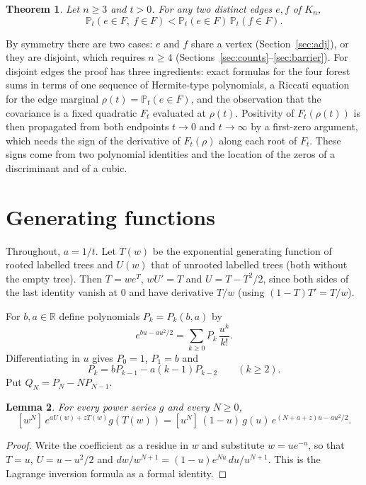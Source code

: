 \documentclass[11pt]{amsart}
\newtheorem{theorem}{Theorem}[section]
\newtheorem{lemma}[theorem]{Lemma}
\theoremstyle{remark}
\newcommand{\Pt}{\mathbb{P}_t}
\begin{document}
\begin{theorem}\label{thm:main}
Let $n\ge3$ and $t>0$. For any two distinct edges $e,f$ of $K_n$,
\[
\Pt(e\in F,\ f\in F)<\Pt(e\in F)\,\Pt(f\in F).
\]
\end{theorem}

By symmetry there are two cases: $e$ and $f$ share a vertex (Section~\ref{sec:adj}),
or they are disjoint, which requires $n\ge4$ (Sections~\ref{sec:counts}--\ref{sec:barrier}).
For disjoint edges the proof has three ingredients: exact formulas for the four forest
sums in terms of one sequence of Hermite-type polynomials, a Riccati equation for the
edge marginal $\rho(t)=\Pt(e\in F)$, and the observation that the covariance is a fixed
quadratic $F_t$ evaluated at $\rho(t)$. Positivity of $F_t(\rho(t))$ is then propagated
from both endpoints $t\to0$ and $t\to\infty$ by a first-zero argument, which needs the
sign of the derivative of $F_t(\rho)$ along each root of $F_t$. These signs come from
two polynomial identities and the location of the zeros of a discriminant and of a
cubic.

\section{Generating functions}\label{sec:gf}

Throughout, $a=1/t$. Let $T(w)$ be the exponential generating function of rooted
labelled trees and $U(w)$ that of unrooted labelled trees (both without the empty tree).
Then $T=we^{T}$, $wU'=T$ and $U=T-T^2/2$, since both sides of the last identity vanish
at $0$ and have derivative $T/w$ (using $(1-T)T'=T/w$).

For $b,a\in\mathbb{R}$ define polynomials $P_k=P_k(b,a)$ by
\[
e^{bu-au^2/2}=\sum_{k\ge0}P_k\,\frac{u^k}{k!}.
\]
Differentiating in $u$ gives $P_0=1$, $P_1=b$ and
\begin{equation}\label{eq:rec}
P_k=bP_{k-1}-a(k-1)P_{k-2}\qquad(k\ge2).
\end{equation}
Put $Q_N=P_N-NP_{N-1}$.

\begin{lemma}\label{lem:subst}
For every power series $g$ and every $N\ge0$,
\[
[w^N]\,e^{aU(w)+zT(w)}g(T(w))=[u^N]\,(1-u)\,g(u)\,e^{(N+a+z)u-au^2/2}.
\]
\end{lemma}

\begin{proof}
Write the coefficient as a residue in $w$ and substitute $w=ue^{-u}$, so that $T=u$,
$U=u-u^2/2$ and $dw/w^{N+1}=(1-u)e^{Nu}\,du/u^{N+1}$. This is the Lagrange
inversion formula as a formal identity.
\end{proof}
\end{document}
